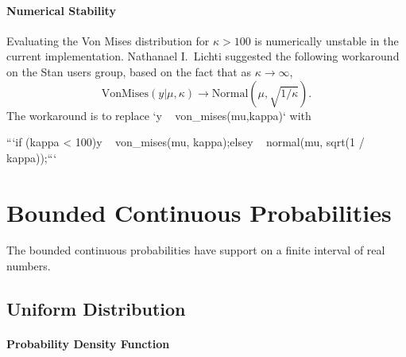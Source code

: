 \begin{description}
\begin{description}    \end{description}


\begin{description}    \end{description}


\subsubsection{Numerical Stability}


Evaluating the Von Mises distribution for $\kappa > 100$ is numerically unstable in the current implementation.  Nathanael I.\ Lichti suggested the following workaround on the Stan users group, based on the fact that as $\kappa \rightarrow \infty$, \[ \text{VonMises}(y|\mu,\kappa) \rightarrow \text{Normal}(\mu, \sqrt{1 / \kappa}). \] The workaround is to replace `y ~ von_mises(mu,kappa)` with


```\n if (kappa < 100)\n   y ~ von_mises(mu, kappa);\n else\n   y ~ normal(mu, sqrt(1 / kappa));\n ```


\chapter{Bounded Continuous Probabilities}


The bounded continuous probabilities have support on a finite interval of real numbers.


\section{Uniform Distribution}


\subsubsection{Probability Density Function}



\end{description}
